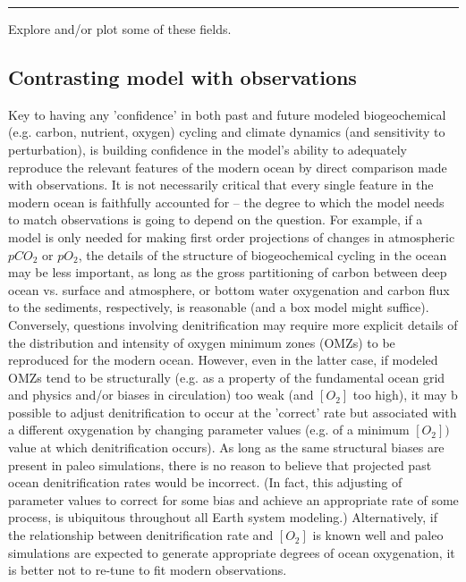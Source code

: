 \vspace{1mm}\noindent\rule{4cm}{0.5pt}\vspace{2mm}

\noindent Explore and/or plot some of these fields.

\newpage

\subsection{Contrasting model with observations}

Key  to having any 'confidence' in both past and future modeled biogeochemical (e.g. carbon, nutrient, oxygen) cycling and climate dynamics (and sensitivity to perturbation), is building confidence in the model's ability to adequately reproduce the relevant features of the modern ocean by direct comparison made with observations. It is not necessarily critical that every single feature in the modern ocean is faithfully accounted for -- the degree to which the model needs  to match observations is going to depend on the question. For example, if a model is only needed for making first order projections of changes in atmospheric \(pCO_{2}\) or \(pO_{2}\), the details of the structure of biogeochemical cycling in the ocean may be less important, as long as the gross partitioning of carbon between deep ocean vs. surface and atmosphere, or  bottom water oxygenation and carbon flux to the sediments, respectively, is reasonable (and a box model might suffice). Conversely, questions involving denitrification may require more explicit details of the distribution and intensity of oxygen minimum zones (OMZs) to be reproduced for the modern ocean. However, even in the latter case, if modeled OMZs tend to be structurally (e.g. as a property of the fundamental ocean grid and physics and/or biases in circulation) too weak (and $[O_{2}]$ too high), it may b possible to adjust denitrification to occur at the 'correct' rate but associated with a different oxygenation by changing parameter values (e.g. of a minimum \([O_{2}])\) value at which denitrification occurs). As long as the same structural biases are present in paleo simulations, there is no reason to believe that projected past ocean denitrification rates would be incorrect. (In fact, this adjusting of parameter values to correct for some bias and achieve an appropriate rate of some process, is ubiquitous throughout all Earth system modeling.) Alternatively, if the relationship between denitrification rate and $[O_{2}]$ is known well and paleo simulations are expected to generate appropriate degrees of ocean oxygenation, it is better not to re-tune to fit modern observations.

